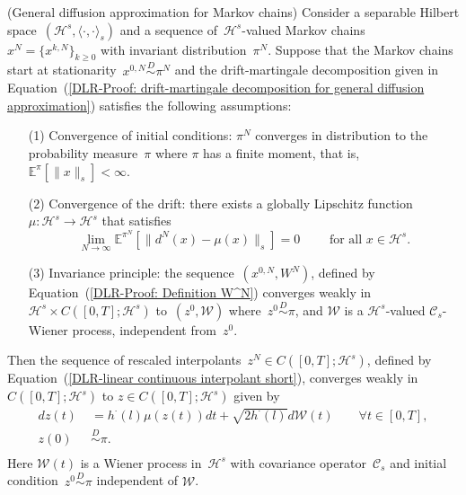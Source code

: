 \begin{proposition}\autocite[Proposition 3.1]{Pillai2012}(General diffusion approximation for Markov chains)
  \label{DLR-Proof: Proposition General diffusion approximation}
  Consider a separable Hilbert space~$(\mathcal{H}^s, \langle \cdot, \cdot \rangle_s)$ and a sequence of~$\mathcal{H}^s$-valued Markov chains~$x^N = \{ x^{k,N} \}_{k \geq 0}$ with invariant distribution~$\pi^N$. Suppose that the Markov chains start at stationarity~$x^{0,N} \stackrel{D}{\sim} \pi^N$ and the drift-martingale decomposition given in Equation~(\ref{DLR-Proof: drift-martingale decomposition for general diffusion approximation}) satisfies the following assumptions:
  \begin{enumerate}
    \item[(1)] Convergence of initial conditions: $\pi^N$ converges in distribution to the probability measure~$\pi$ where $\pi$ has a finite moment, that is, $\mathbb{E}^{\pi}[\|x\|_s]<\infty$. 
    \item[(2)] Convergence of the drift: there exists a globally Lipschitz function~$\mu:\mathcal{H}^s \to \mathcal{H}^s$ that satisfies
    \begin{equation*}
      \lim_{N \to \infty} \mathbb{E}^{\pi^N}[ \|  d^N(x) - \mu(x) \|_{s} ] = 0 \qquad \text{ for all } x \in \mathcal{H}^s.
    \end{equation*}
    \item[(3)] Invariance principle: the sequence~$(x^{0,N}, W^N)$, defined by Equation~(\ref{DLR-Proof: Definition W^N}) converges weakly in $\mathcal{H}^s \times C([0,T]; \mathcal{H}^s)$ to~$(z^0, \mathcal{W})$ where~$z^0 \stackrel{D}{\sim} \pi$, and $\mathcal{W}$ is a $\mathcal{H}^s$-valued $\mathcal{C}_s$-Wiener process, independent from~$z^0$.
  \end{enumerate}
  
  Then the sequence of rescaled interpolants~$z^N \in C([0,T]; \mathcal{H}^s)$, defined by Equation~(\ref{DLR-linear continuous interpolant short}), converges weakly in $ C([0,T]; \mathcal{H}^s)$ to $z \in  C([0,T]; \mathcal{H}^s)$ given by
  \begin{equation*}
    \begin{split}
     dz(t) & \;=   h^{\cdot}(l) \mu(z(t)) dt + \sqrt{2 h^{\cdot}(l)} d\mathcal{W}(t) \qquad \forall t \in [0,T], \\
     z(0) & \; \stackrel{D}{\sim} \pi.\\
    \end{split}
  \end{equation*}
  Here $\mathcal{W}(t)$ is a Wiener process in~$\mathcal{H}^s$ with covariance operator~$\mathcal{C}_s$ and initial condition~$z^0 \stackrel{D}{\sim} \pi$ independent of $\mathcal{W}$.

\end{proposition}

